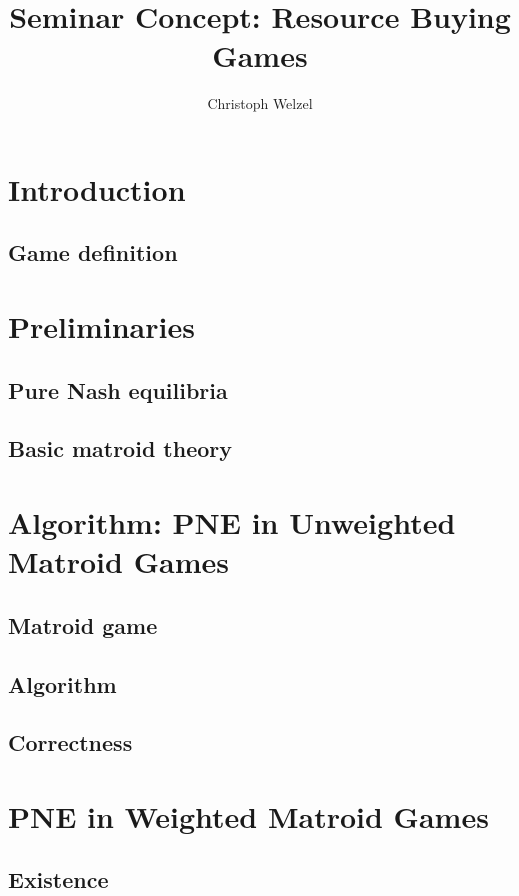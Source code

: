 \documentclass{tufte-handout}
\title{Seminar Concept: Resource Buying Games}
\author[C. Welzel]{Christoph Welzel}
\begin{document}
\maketitle
\section{Introduction}
  \subsection{Game definition}
  \vspace{2cm}

\section{Preliminaries}
  \subsection{Pure Nash equilibria}
  \vspace{2cm}
  \subsection{Basic matroid theory}
  \vspace{2cm}

\section{Algorithm: PNE in Unweighted Matroid Games}
  \subsection{Matroid game}
  \vspace{2cm}
  \subsection{Algorithm}
  \vspace{2cm}
  \subsection{Correctness}
  \vspace{2cm}

\section{PNE in Weighted Matroid Games}
  \subsection{Existence}
  \vspace{2cm}
\end{document}
